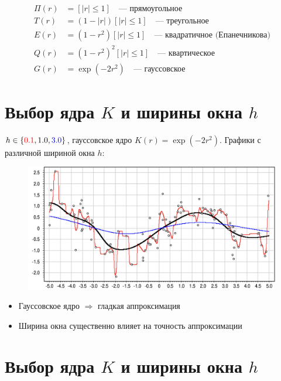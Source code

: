 \begin{align*}
\Pi(r) &= [{\lvert r \rvert \leq 1}] \quad \text{— прямоугольное} \\
T(r) &= (1 - \lvert r \rvert) [{\lvert r \rvert \leq 1}] \quad \text{— треугольное} \\
E(r) &= (1 - r^2) [{\lvert r \rvert \leq 1}] \quad \text{— квадратичное (Епанечникова)} \\
Q(r) &= (1 - r^2)^2 [{\lvert r \rvert \leq 1}] \quad \text{— квартическое} \\
G(r) &= \exp(-2r^2) \quad \text{— гауссовское}
\end{align*}


\section*{Выбор ядра \(K\) и ширины окна \(h\)}

\noindent
\(h \in \{\textcolor{red}{0.1}, 1.0, \textcolor{blue}{3.0}\}\), гауссовское ядро \(K(r) = \exp(-2r^2)\).
Графики с различной шириной окна \(h\):
\begin{figure}[ht]
    \centering
    \includegraphics[width=\textwidth]{chapters/metric/images/I2.png}
    \label{fig:kernel_choice}
\end{figure}

\begin{itemize}
    \item Гауссовское ядро \(\Rightarrow\) гладкая аппроксимация
    \item Ширина окна существенно влияет на точность аппроксимации
\end{itemize}

\section*{Выбор ядра \(K\) и ширины окна \(h\)}

